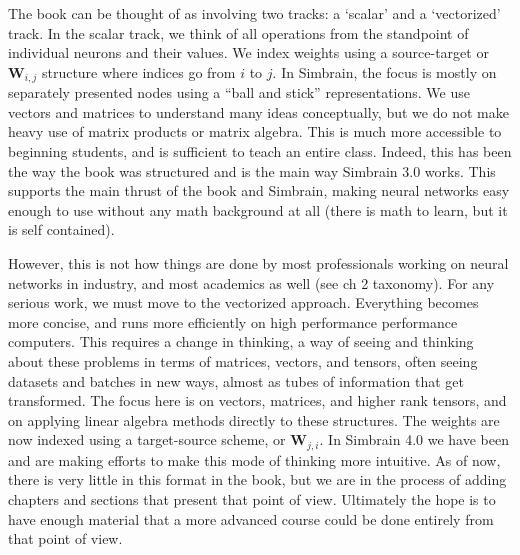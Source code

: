 


The book can be thought of as involving two tracks: a `scalar' and a `vectorized' track. In the scalar track, we think of all operations from the standpoint of individual neurons and their values. We index weights using a source-target or $\textbf{W}_{i,j}$ structure where indices go from $i$ to $j$. In Simbrain, the focus is mostly on separately presented nodes using a ``ball and stick'' representations. We use vectors and matrices to understand many ideas conceptually, but we do not make heavy use of matrix products or matrix algebra. This is much more accessible to beginning students, and is sufficient to teach an entire class. Indeed, this has been the way the book was structured and is the main way Simbrain 3.0 works. This supports the main thrust of the book and Simbrain, making neural networks easy enough to use without any math background at all (there is math to learn, but it is self contained). 

However, this is not how things are done by most professionals working on neural networks in industry, and most academics as well (see ch 2 taxonomy). For any serious work, we must move to the vectorized approach. Everything becomes more concise, and runs more efficiently on high performance performance computers. This requires a change in thinking, a way of seeing and thinking about these problems in terms of matrices, vectors, and tensors, often seeing datasets and batches in new ways, almost as tubes of information that get transformed. The focus here is on vectors, matrices, and higher rank tensors, and on applying linear algebra methods directly to these structures. The weights are now indexed using a target-source scheme, or $\textbf{W}_{j,i}$. In Simbrain 4.0 we have been and are making efforts to make this mode of thinking more intuitive. As of now, there is very little in this format in the book, but we are in the process of adding chapters and sections that present that point of view. Ultimately the hope is to have enough material that a more advanced course could be done entirely from that point of view.

